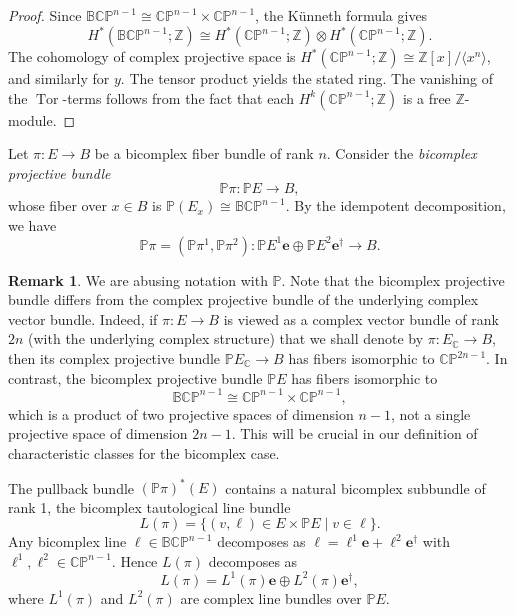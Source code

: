 \documentclass[11pt]{amsart}
\newcommand{\C}{\mathbb{C}}          %
\newcommand{\Z}{\mathbb{Z}}
\renewcommand{\P}{\mathbb{P}}
\newcommand{\e}{\mathbf{e}}          %
\newcommand{\ed}{\mathbf{e}^\dagger} %
\newcommand{\Tor}{\operatorname{Tor}}
\newcommand{\BCP}{\mathbb{BCP}}
\newcommand{\CP}{\mathbb{CP}}
\theoremstyle{definition}
\newtheorem{remark}[prop]{Remark}            %
\begin{document}
\begin{proof}
    Since $\BCP^{n-1} \cong \CP^{n-1} \times \CP^{n-1}$, the Künneth formula gives
    \begin{equation*}
        H^*(\BCP^{n-1};\Z) \cong H^*(\CP^{n-1};\Z) \otimes H^*(\CP^{n-1};\Z).
    \end{equation*}
    The cohomology of complex projective space is $H^*(\CP^{n-1};\Z) \cong \Z[x]/\langle x^{n}\rangle$, and similarly for $y$. The tensor product yields the stated ring. The vanishing of the $\Tor$-terms follows from the fact that each $H^k(\CP^{n-1};\Z)$ is a free $\Z$-module.
\end{proof}


Let $\pi: E \to B$ be a bicomplex fiber bundle of rank $n$. Consider the \emph{bicomplex projective bundle}
\begin{equation*}
    \P\pi: \P E \to B,
\end{equation*}
whose fiber over $x \in B$ is $\P(E_x) \cong \BCP^{n-1}$. By the idempotent decomposition, we have
\begin{equation*}
    \P\pi = (\P\pi^1, \P\pi^2): \P E^1\e \oplus \P E^2\ed \to B.
\end{equation*}

\begin{remark}\label{rem:projective_abuse}
    We are abusing notation with $\P$. Note that the bicomplex projective bundle differs from the complex projective bundle of the underlying complex vector bundle. Indeed, if $\pi:E \to B$ is viewed as a complex vector bundle of rank $2n$ (with the underlying complex structure) that we shall denote by $\pi:E_\C\to B$, then its complex projective bundle $\P E_{\C} \to B$ has fibers isomorphic to $\CP^{2n-1}$. In contrast, the bicomplex projective bundle $\P E$ has fibers isomorphic to
    \begin{equation*}
        \BCP^{n-1} \cong \CP^{n-1} \times \CP^{n-1},
    \end{equation*}
    which is a product of two projective spaces of dimension $n-1$, not a single projective space of dimension $2n-1$. This will be crucial in our definition of characteristic classes for the bicomplex case.
\end{remark}

The pullback bundle $(\P\pi)^*(E)$ contains a natural bicomplex subbundle of rank 1, the bicomplex tautological line bundle
\begin{equation*}
    L(\pi) = \{ (v, \ell) \in E \times \P E \mid v \in \ell \}.
\end{equation*}
Any bicomplex line $\ell \in \BCP^{n-1}$ decomposes as $\ell = \ell^1\e + \ell^2\ed$ with $\ell^1, \ell^2 \in \CP^{n-1}$. Hence $L(\pi)$ decomposes as
\begin{equation*}
    L(\pi) = L^1(\pi)\e \oplus L^2(\pi)\ed,
\end{equation*}
where $L^1(\pi)$ and $L^2(\pi)$ are complex line bundles over $\P E$.
\end{document}
